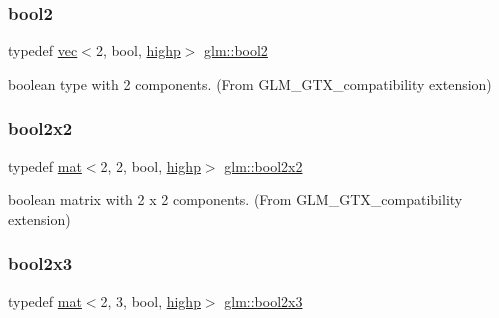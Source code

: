\subsubsection{\texorpdfstring{bool2}{bool2}}
{\footnotesize\ttfamily typedef \mbox{\hyperlink{structglm_1_1vec}{vec}}$<$2, bool, \mbox{\hyperlink{namespaceglm_a36ed105b07c7746804d7fdc7cc90ff25ac6f7eab42eacbb10d59a58e95e362074}{highp}}$>$ \mbox{\hyperlink{group__gtx__compatibility_ga19e8114c90e2c81cfa87db72f4020b52}{glm\+::bool2}}}



boolean type with 2 components. (From G\+L\+M\+\_\+\+G\+T\+X\+\_\+compatibility extension) 

\mbox{\label{group__gtx__compatibility_ga1a3707855138ba2d14b7f2ccfb93f476}} 
\subsubsection{\texorpdfstring{bool2x2}{bool2x2}}
{\footnotesize\ttfamily typedef \mbox{\hyperlink{structglm_1_1mat}{mat}}$<$2, 2, bool, \mbox{\hyperlink{namespaceglm_a36ed105b07c7746804d7fdc7cc90ff25ac6f7eab42eacbb10d59a58e95e362074}{highp}}$>$ \mbox{\hyperlink{group__gtx__compatibility_ga1a3707855138ba2d14b7f2ccfb93f476}{glm\+::bool2x2}}}



boolean matrix with 2 x 2 components. (From G\+L\+M\+\_\+\+G\+T\+X\+\_\+compatibility extension) 

\mbox{\label{group__gtx__compatibility_gabbcc655d12f2f13ddc1917414389e8e1}} 
\subsubsection{\texorpdfstring{bool2x3}{bool2x3}}
{\footnotesize\ttfamily typedef \mbox{\hyperlink{structglm_1_1mat}{mat}}$<$2, 3, bool, \mbox{\hyperlink{namespaceglm_a36ed105b07c7746804d7fdc7cc90ff25ac6f7eab42eacbb10d59a58e95e362074}{highp}}$>$ \mbox{\hyperlink{group__gtx__compatibility_gabbcc655d12f2f13ddc1917414389e8e1}{glm\+::bool2x3}}}



